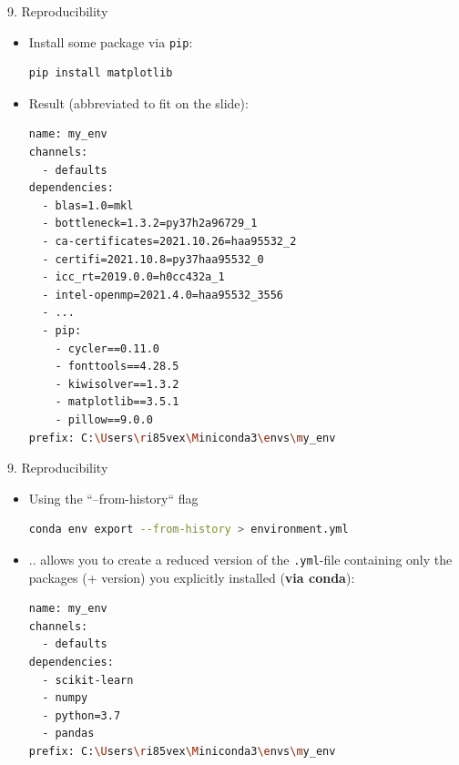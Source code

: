\begin{vbframe}{9. Reproducibility}

\vfill

\begin{itemize}
	\item Install some package via \texttt{pip}:
		\begin{lstlisting}[language=bash]
pip install matplotlib
		\end{lstlisting}
	\item Result (abbreviated to fit on the slide):
		\begin{lstlisting}[language=bash,basicstyle=\tiny\ttfamily]
name: my_env
channels:
  - defaults
dependencies:
  - blas=1.0=mkl
  - bottleneck=1.3.2=py37h2a96729_1
  - ca-certificates=2021.10.26=haa95532_2
  - certifi=2021.10.8=py37haa95532_0
  - icc_rt=2019.0.0=h0cc432a_1
  - intel-openmp=2021.4.0=haa95532_3556
  - ...
  - pip:
    - cycler==0.11.0
    - fonttools==4.28.5
    - kiwisolver==1.3.2
    - matplotlib==3.5.1
    - pillow==9.0.0
prefix: C:\Users\ri85vex\Miniconda3\envs\my_env
		\end{lstlisting}
\end{itemize}

\vfill

\end{vbframe}


\begin{vbframe}{9. Reproducibility}

\vfill

\begin{itemize}
	\item Using the ``--from-history`` flag
		\begin{lstlisting}[language=bash]
conda env export --from-history > environment.yml
		\end{lstlisting}
	\item .. allows you to create a reduced version of the \texttt{.yml}-file containing only the packages (+ version) you explicitly installed (\textbf{via conda}):  
		\begin{lstlisting}[language=bash]
name: my_env
channels:
  - defaults
dependencies:
  - scikit-learn
  - numpy
  - python=3.7
  - pandas
prefix: C:\Users\ri85vex\Miniconda3\envs\my_env
		\end{lstlisting}
\end{itemize}

\vfill

\end{vbframe}

